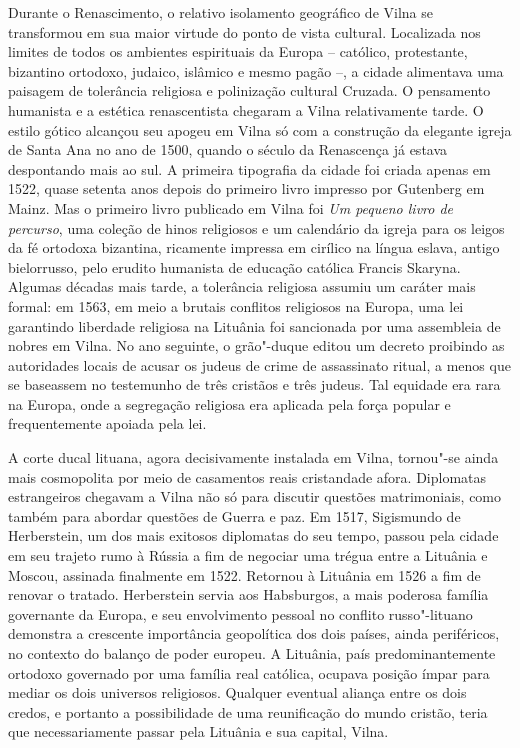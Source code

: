 Durante o Renascimento, o relativo isolamento geográfico de Vilna se
transformou em sua maior virtude do ponto de vista cultural. Localizada
nos limites de todos os ambientes espirituais da Europa -- católico,
protestante, bizantino ortodoxo, judaico, islâmico e mesmo pagão --, a
cidade alimentava uma paisagem de tolerância religiosa e polinização
cultural Cruzada. O pensamento humanista e a estética renascentista
chegaram a Vilna relativamente tarde. O estilo gótico alcançou seu
apogeu em Vilna só com a construção da elegante igreja de Santa Ana no
ano de 1500, quando o século da Renascença já estava despontando mais ao
sul. A primeira tipografia da cidade foi criada apenas em 1522, quase
setenta anos depois do primeiro livro impresso por Gutenberg em Mainz.
Mas o primeiro livro publicado em Vilna foi \textit{Um pequeno livro de
percurso}, uma coleção de hinos religiosos e um calendário da igreja
para os leigos da fé ortodoxa bizantina, ricamente impressa em cirílico
na língua eslava, antigo bielorrusso, pelo erudito humanista de educação
católica Francis Skaryna. Algumas décadas mais tarde, a tolerância
religiosa assumiu um caráter mais formal: em 1563, em meio a brutais
conflitos religiosos na Europa, uma lei garantindo liberdade religiosa
na Lituânia foi sancionada por uma assembleia de nobres em Vilna. No ano
seguinte, o grão"-duque editou um decreto proibindo as autoridades locais
de acusar os judeus de crime de assassinato ritual, a menos que se
baseassem no testemunho de três cristãos e três judeus. Tal equidade era
rara na Europa, onde a segregação religiosa era aplicada pela força
popular e frequentemente apoiada pela lei.

A corte ducal lituana, agora decisivamente instalada em Vilna, tornou"-se
ainda mais cosmopolita por meio de casamentos reais cristandade afora.
Diplomatas estrangeiros chegavam a Vilna não só para discutir questões
matrimoniais, como também para abordar questões de Guerra e paz. Em
1517, Sigismundo de Herberstein, um dos mais exitosos diplomatas do seu
tempo, passou pela cidade em seu trajeto rumo à Rússia a fim de negociar
uma trégua entre a Lituânia e Moscou, assinada finalmente em 1522.
Retornou à Lituânia em 1526 a fim de renovar o tratado. Herberstein
servia aos Habsburgos, a mais poderosa família governante da Europa, e
seu envolvimento pessoal no conflito russo"-lituano demonstra a crescente
importância geopolítica dos dois países, ainda periféricos, no contexto
do balanço de poder europeu. A Lituânia, país predominantemente ortodoxo
governado por uma família real católica, ocupava posição ímpar para
mediar os dois universos religiosos. Qualquer eventual aliança entre os
dois credos, e portanto a possibilidade de uma reunificação do mundo
cristão, teria que necessariamente passar pela Lituânia e sua capital,
Vilna.

